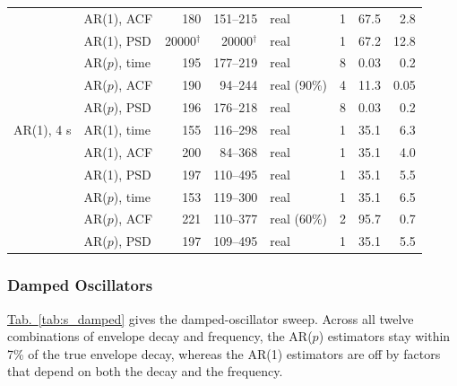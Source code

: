 \documentclass[pdflatex,lineno,sn-nature]{sn-jnl}
\newcommand{\tabpanel}[2][]{\hyperref[#2]{Tab.~#1\ref*{#2}}}
\theoremstyle{thmstyleone}
\theoremstyle{thmstyletwo}
\theoremstyle{thmstylethree}
\begin{document}
\begin{table}[h]
\begin{tabular}{llrrlrrr}
 & AR(1), ACF & 180 & 151--215 & real & 1 & 67.5 & 2.8 \\
 & AR(1), PSD & 20000$^\dagger$ & 20000$^\dagger$ & real & 1 & 67.2 & 12.8 \\
 & AR($p$), time & 195 & 177--219 & real & 8 & 0.03 & 0.2 \\
 & AR($p$), ACF & 190 & 94--244 & real (90\%) & 4 & 11.3 & 0.05 \\
 & AR($p$), PSD & 196 & 176--218 & real & 8 & 0.03 & 0.2 \\
\midrule
AR(1), 4 s & AR(1), time & 155 & 116--298 & real & 1 & 35.1 & 6.3 \\
 & AR(1), ACF & 200 & 84--368 & real & 1 & 35.1 & 4.0 \\
 & AR(1), PSD & 197 & 110--495 & real & 1 & 35.1 & 5.5 \\
 & AR($p$), time & 153 & 119--300 & real & 1 & 35.1 & 6.5 \\
 & AR($p$), ACF & 221 & 110--377 & real (60\%) & 2 & 95.7 & 0.7 \\
 & AR($p$), PSD & 197 & 109--495 & real & 1 & 35.1 & 5.5 \\
\bottomrule
\end{tabular}
\end{table}

\subsubsection*{Damped Oscillators}

\tabpanel{tab:s_damped} gives the damped-oscillator sweep. Across all twelve combinations of envelope decay and frequency, the AR($p$) estimators stay within 7\% of the true envelope decay, whereas the AR(1) estimators are off by factors that depend on both the decay and the frequency.
\end{document}
